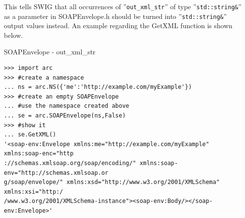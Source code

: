 \documentclass{article}
\begin{document}
\begin{flushleft}
\begin{itemize}
{\begin{verbatim}
  \end{verbatim}
  This tells SWIG that all occurrences of ''\verb$out_xml_str$'' of type ''\verb$std::string&$'' as a parameter in SOAPEnvelope.h
  should be turned into ''\verb$std::string&$'' output values instead. An example regarding the GetXML function is shown below.
    \begin{example}
      \caption{SOAPEnvelope - out\_xml\_str}\label{outxmlex}
\begin{verbatim}
>>> import arc
>>> #create a namespace
... ns = arc.NS({'me':'http://example.com/myExample'})
>>> #create an empty SOAPEnvelope
... #use the namespace created above
... se = arc.SOAPEnvelope(ns,False)
>>> #show it
... se.GetXML()
'<soap-env:Envelope xmlns:me="http://example.com/myExample" xmlns:soap-enc="http
://schemas.xmlsoap.org/soap/encoding/" xmlns:soap-env="http://schemas.xmlsoap.or
g/soap/envelope/" xmlns:xsd="http://www.w3.org/2001/XMLSchema" xmlns:xsi="http:/
/www.w3.org/2001/XMLSchema-instance"><soap-env:Body/></soap-env:Envelope>'
\end{verbatim}
    \end{example}
  }
\end{itemize}
\end{flushleft}
\end{document}
